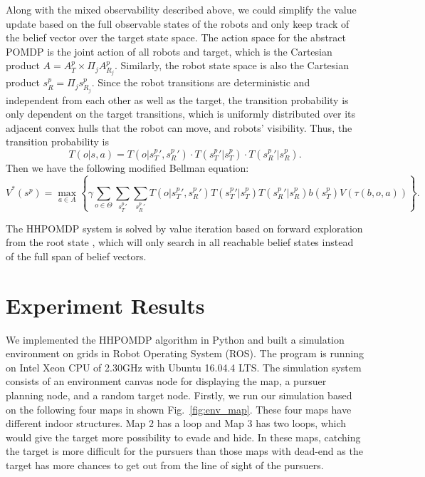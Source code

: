 \documentclass[../main.tex]{subfiles}
\begin{document}
Along with the mixed observability described above, we could simplify the value update based on the full observable states of the robots and only keep track of the belief vector over the target state space. The action space for the abstract POMDP is the joint action of all robots and target, which is the Cartesian product $A = A_T^p \times \Pi_{j}A_{R_j}^p$. Similarly, the robot state space is also the Cartesian product $s_R^p = \Pi_{j}s_{R_j}^p$. Since the robot transitions are deterministic and independent from each other as well as the target, the transition probability is only dependent on the target transitions, which is uniformly distributed over its adjacent convex hulls that the robot can move, and robots' visibility. Thus, the transition probability is
\begin{equation}
T(o | s,a) = T(o| {s_T ^p}', {s_R ^p}') \cdot T({s_T ^p} ' | s_T ^p) \cdot T({s_R ^p} ' | s_R ^p). 
\end{equation}
Then we have the following modified Bellman equation:
\begin{equation}
\displaystyle
V^* ( s^p ) = \max _ { a \in A } \left\{ \gamma \sum_{ o \in \Theta } \sum_{ {s^p_T} '} \sum_{ {s^p_R} ' } T ( o | {s_T^p}' , {s_R^p}') T({s_T^p} ' | s_T^p) T({s_R^p} ' | s_R^p) b ( s_T^p ) V ( \tau ( b ,o ,a ) ) \right\}.
\end{equation}

The HHPOMDP system is solved by value iteration based on forward exploration from the root state \cite{hauskrecht2000value}, which will only search in all reachable belief states instead of the full span of belief vectors.




\section{Experiment Results} \label{sec:result}
We implemented the HHPOMDP algorithm in Python and built a simulation environment on grids in Robot Operating System (ROS). The program is running on Intel Xeon CPU of 2.30GHz with Ubuntu 16.04.4 LTS. %
The simulation system consists of an environment canvas node for displaying the map, a pursuer planning node, and a random target node. Firstly, we run our simulation based on the following four maps in shown Fig.~\ref{fig:env_map}. These four maps have different indoor structures. Map 2 has a loop and Map 3 has two loops, which would give the target more possibility to evade and hide. In these maps, catching the target is more difficult for the pursuers than those maps with dead-end as the target has more chances to get out from the line of sight of the pursuers.
\end{document}
